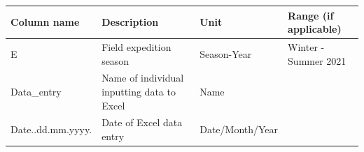 \documentclass[
  12pt,
]{article}
\begin{document}
\begin{longtable}[]{@{}llll@{}}
\toprule
\begin{minipage}[b]{0.18\columnwidth}\raggedright
Column name\strut
\end{minipage} & \begin{minipage}[b]{0.35\columnwidth}\raggedright
Description\strut
\end{minipage} & \begin{minipage}[b]{0.18\columnwidth}\raggedright
Unit\strut
\end{minipage} & \begin{minipage}[b]{0.18\columnwidth}\raggedright
Range (if applicable)\strut
\end{minipage}\tabularnewline
\midrule
\endhead
\begin{minipage}[t]{0.18\columnwidth}\raggedright
E\strut
\end{minipage} & \begin{minipage}[t]{0.35\columnwidth}\raggedright
Field expedition season\strut
\end{minipage} & \begin{minipage}[t]{0.18\columnwidth}\raggedright
Season-Year\strut
\end{minipage} & \begin{minipage}[t]{0.18\columnwidth}\raggedright
Winter - Summer 2021\strut
\end{minipage}\tabularnewline
\begin{minipage}[t]{0.18\columnwidth}\raggedright
Data\_entry\strut
\end{minipage} & \begin{minipage}[t]{0.35\columnwidth}\raggedright
Name of individual inputting data to Excel\strut
\end{minipage} & \begin{minipage}[t]{0.18\columnwidth}\raggedright
Name\strut
\end{minipage} & \begin{minipage}[t]{0.18\columnwidth}\raggedright
\strut
\end{minipage}\tabularnewline
\begin{minipage}[t]{0.18\columnwidth}\raggedright
Date..dd.mm.yyyy.\strut
\end{minipage} & \begin{minipage}[t]{0.35\columnwidth}\raggedright
Date of Excel data entry\strut
\end{minipage} & \begin{minipage}[t]{0.18\columnwidth}\raggedright
Date/Month/Year\strut

\end{minipage}
\end{longtable}
\end{document}
